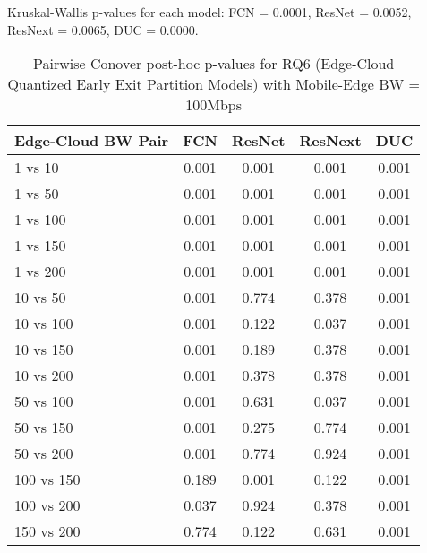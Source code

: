 \begin{table}[h]
\centering
\caption{Pairwise Conover post-hoc p-values for RQ6 (Edge-Cloud Quantized Early Exit Partition Models) with Mobile-Edge BW = 100Mbps}
\label{tab:conover_edge_cloud_quantized_earlyexit_partition_me100}
\smallskip
Kruskal-Wallis p-values for each model: FCN = 0.0001, ResNet = 0.0052, ResNext = 0.0065, DUC = 0.0000.

\begin{tabular}{lcccc}
\toprule
Edge-Cloud BW Pair & FCN & ResNet & ResNext & DUC \\
\midrule
1 vs 10 & 0.001 & 0.001 & 0.001 & 0.001 \\
1 vs 50 & 0.001 & 0.001 & 0.001 & 0.001 \\
1 vs 100 & 0.001 & 0.001 & 0.001 & 0.001 \\
1 vs 150 & 0.001 & 0.001 & 0.001 & 0.001 \\
1 vs 200 & 0.001 & 0.001 & 0.001 & 0.001 \\
10 vs 50 & 0.001 & 0.774 & 0.378 & 0.001 \\
10 vs 100 & 0.001 & 0.122 & 0.037 & 0.001 \\
10 vs 150 & 0.001 & 0.189 & 0.378 & 0.001 \\
10 vs 200 & 0.001 & 0.378 & 0.378 & 0.001 \\
50 vs 100 & 0.001 & 0.631 & 0.037 & 0.001 \\
50 vs 150 & 0.001 & 0.275 & 0.774 & 0.001 \\
50 vs 200 & 0.001 & 0.774 & 0.924 & 0.001 \\
100 vs 150 & 0.189 & 0.001 & 0.122 & 0.001 \\
100 vs 200 & 0.037 & 0.924 & 0.378 & 0.001 \\
150 vs 200 & 0.774 & 0.122 & 0.631 & 0.001 \\
\bottomrule
\end{tabular}
\end{table}


